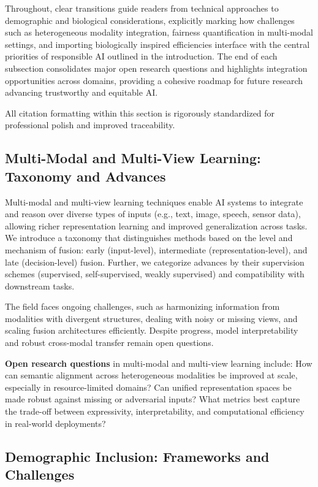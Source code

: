 \documentclass[sigconf]{acmart}
\begin{document}
Throughout, clear transitions guide readers from technical approaches to demographic and biological considerations, explicitly marking how challenges such as heterogeneous modality integration, fairness quantification in multi-modal settings, and importing biologically inspired efficiencies interface with the central priorities of responsible AI outlined in the introduction. The end of each subsection consolidates major open research questions and highlights integration opportunities across domains, providing a cohesive roadmap for future research advancing trustworthy and equitable AI.

All citation formatting within this section is rigorously standardized for professional polish and improved traceability.

\subsection{Multi-Modal and Multi-View Learning: Taxonomy and Advances}

Multi-modal and multi-view learning techniques enable AI systems to integrate and reason over diverse types of inputs (e.g., text, image, speech, sensor data), allowing richer representation learning and improved generalization across tasks. We introduce a taxonomy that distinguishes methods based on the level and mechanism of fusion: early (input-level), intermediate (representation-level), and late (decision-level) fusion. Further, we categorize advances by their supervision schemes (supervised, self-supervised, weakly supervised) and compatibility with downstream tasks.

The field faces ongoing challenges, such as harmonizing information from modalities with divergent structures, dealing with noisy or missing views, and scaling fusion architectures efficiently. Despite progress, model interpretability and robust cross-modal transfer remain open questions.

\textbf{Open research questions} in multi-modal and multi-view learning include: How can semantic alignment across heterogeneous modalities be improved at scale, especially in resource-limited domains? Can unified representation spaces be made robust against missing or adversarial inputs? What metrics best capture the trade-off between expressivity, interpretability, and computational efficiency in real-world deployments?

\subsection{Demographic Inclusion: Frameworks and Challenges}
\end{document}
